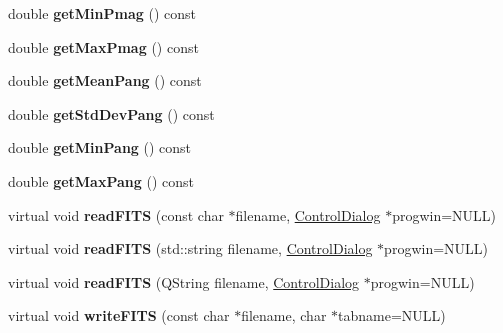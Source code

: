 \begin{DoxyCompactItemize}
\item 
\hypertarget{classSkymap_a66140391b09076ea5029d0ab985206c7}{
double {\bfseries getMinPmag} () const }
\label{classSkymap_a66140391b09076ea5029d0ab985206c7}

\item 
\hypertarget{classSkymap_a9798d14d1b3e9056c7a79c7361ae8f72}{
double {\bfseries getMaxPmag} () const }
\label{classSkymap_a9798d14d1b3e9056c7a79c7361ae8f72}

\item 
\hypertarget{classSkymap_aa4f1033d4204caa82195cc5600973a2b}{
double {\bfseries getMeanPang} () const }
\label{classSkymap_aa4f1033d4204caa82195cc5600973a2b}

\item 
\hypertarget{classSkymap_a4e62052eff47c061947ae98e30680fa8}{
double {\bfseries getStdDevPang} () const }
\label{classSkymap_a4e62052eff47c061947ae98e30680fa8}

\item 
\hypertarget{classSkymap_a0ffa1e7d8deba48394f84f7248aab499}{
double {\bfseries getMinPang} () const }
\label{classSkymap_a0ffa1e7d8deba48394f84f7248aab499}

\item 
\hypertarget{classSkymap_a3d73a0fdc9c456836ff366a793ad7db2}{
double {\bfseries getMaxPang} () const }
\label{classSkymap_a3d73a0fdc9c456836ff366a793ad7db2}

\item 
\hypertarget{classSkymap_a14b07cd8368a997158e7bc517d7455d9}{
virtual void {\bfseries readFITS} (const char $\ast$filename, \hyperlink{classControlDialog}{ControlDialog} $\ast$progwin=NULL)}
\label{classSkymap_a14b07cd8368a997158e7bc517d7455d9}

\item 
\hypertarget{classSkymap_a2a4fffdb8a3bdf77bdf9f5ece97737d7}{
virtual void {\bfseries readFITS} (std::string filename, \hyperlink{classControlDialog}{ControlDialog} $\ast$progwin=NULL)}
\label{classSkymap_a2a4fffdb8a3bdf77bdf9f5ece97737d7}

\item 
\hypertarget{classSkymap_af86ce09e87283c730ca9efe85354423f}{
virtual void {\bfseries readFITS} (QString filename, \hyperlink{classControlDialog}{ControlDialog} $\ast$progwin=NULL)}
\label{classSkymap_af86ce09e87283c730ca9efe85354423f}

\item 
\hypertarget{classSkymap_a154aae2d42dd033245e4d979171d3313}{
virtual void {\bfseries writeFITS} (const char $\ast$filename, char $\ast$tabname=NULL)}
\label{classSkymap_a154aae2d42dd033245e4d979171d3313}


\end{DoxyCompactItemize}
